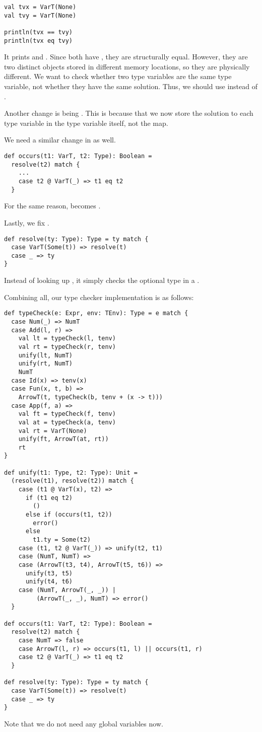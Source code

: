 \begin{verbatim}
val tvx = VarT(None)
val tvy = VarT(None)

println(tvx == tvy)
println(tvx eq tvy)
\end{verbatim}

It prints  and . Since both have , they are
structurally equal. However, they are two distinct  objects stored in
different memory locations, so they are physically different. We want to check
whether two type variables are the same type variable, not whether they have the
same solution. Thus, we should use  instead of \code{==}.

Another change is  being . This is
because that we now store the solution to each type variable in the type
variable itself, not the  map.

We need a similar change in  as well.

\begin{verbatim}
def occurs(t1: VarT, t2: Type): Boolean =
  resolve(t2) match {
    ...
    case t2 @ VarT(_) => t1 eq t2
  }
\end{verbatim}

For the same reason, \code{==} becomes .

Lastly, we fix .

\begin{verbatim}
def resolve(ty: Type): Type = ty match {
  case VarT(Some(t)) => resolve(t)
  case _ => ty
}
\end{verbatim}

Instead of looking up , it simply checks the optional type in a
.

Combining all, our type checker implementation is as follows:

\begin{verbatim}
def typeCheck(e: Expr, env: TEnv): Type = e match {
  case Num(_) => NumT
  case Add(l, r) =>
    val lt = typeCheck(l, tenv)
    val rt = typeCheck(r, tenv)
    unify(lt, NumT)
    unify(rt, NumT)
    NumT
  case Id(x) => tenv(x)
  case Fun(x, t, b) =>
    ArrowT(t, typeCheck(b, tenv + (x -> t)))
  case App(f, a) =>
    val ft = typeCheck(f, tenv)
    val at = typeCheck(a, tenv)
    val rt = VarT(None)
    unify(ft, ArrowT(at, rt))
    rt
}

def unify(t1: Type, t2: Type): Unit =
  (resolve(t1), resolve(t2)) match {
    case (t1 @ VarT(x), t2) =>
      if (t1 eq t2)
        ()
      else if (occurs(t1, t2))
        error()
      else
        t1.ty = Some(t2)
    case (t1, t2 @ VarT(_)) => unify(t2, t1)
    case (NumT, NumT) =>
    case (ArrowT(t3, t4), ArrowT(t5, t6)) =>
      unify(t3, t5)
      unify(t4, t6)
    case (NumT, ArrowT(_, _)) |
         (ArrowT(_, _), NumT) => error()
  }

def occurs(t1: VarT, t2: Type): Boolean =
  resolve(t2) match {
    case NumT => false
    case ArrowT(l, r) => occurs(t1, l) || occurs(t1, r)
    case t2 @ VarT(_) => t1 eq t2
  }

def resolve(ty: Type): Type = ty match {
  case VarT(Some(t)) => resolve(t)
  case _ => ty
}
\end{verbatim}

Note that we do not need any global variables now.
